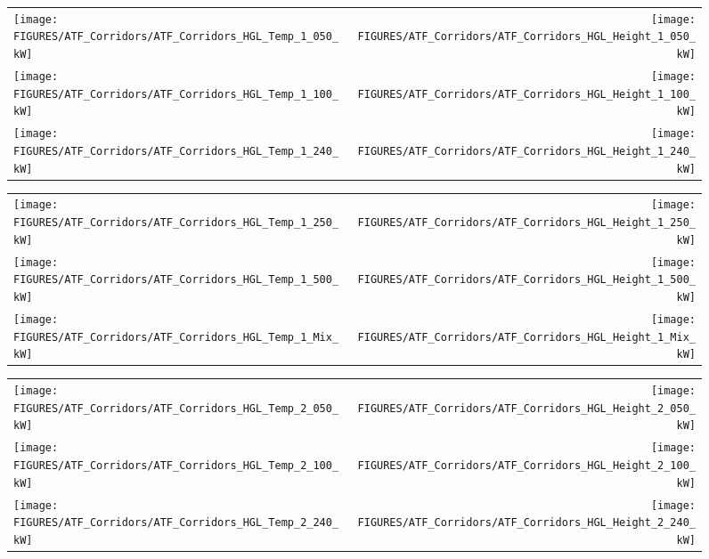 \begin{figure}[h!]
\begin{tabular*}{\textwidth}{l@{\extracolsep{\fill}}r}
\texttt{[image: FIGURES/ATF\_Corridors/ATF\_Corridors\_HGL\_Temp\_1\_050\_kW]} &
\texttt{[image: FIGURES/ATF\_Corridors/ATF\_Corridors\_HGL\_Height\_1\_050\_kW]} \\
\texttt{[image: FIGURES/ATF\_Corridors/ATF\_Corridors\_HGL\_Temp\_1\_100\_kW]} &
\texttt{[image: FIGURES/ATF\_Corridors/ATF\_Corridors\_HGL\_Height\_1\_100\_kW]} \\
\texttt{[image: FIGURES/ATF\_Corridors/ATF\_Corridors\_HGL\_Temp\_1\_240\_kW]} &
\texttt{[image: FIGURES/ATF\_Corridors/ATF\_Corridors\_HGL\_Height\_1\_240\_kW]}
\end{tabular*}
\end{figure}

\newpage

\begin{figure}[p]
\begin{tabular*}{\textwidth}{l@{\extracolsep{\fill}}r}
\texttt{[image: FIGURES/ATF\_Corridors/ATF\_Corridors\_HGL\_Temp\_1\_250\_kW]} &
\texttt{[image: FIGURES/ATF\_Corridors/ATF\_Corridors\_HGL\_Height\_1\_250\_kW]} \\
\texttt{[image: FIGURES/ATF\_Corridors/ATF\_Corridors\_HGL\_Temp\_1\_500\_kW]} &
\texttt{[image: FIGURES/ATF\_Corridors/ATF\_Corridors\_HGL\_Height\_1\_500\_kW]} \\
\texttt{[image: FIGURES/ATF\_Corridors/ATF\_Corridors\_HGL\_Temp\_1\_Mix\_kW]} &
\texttt{[image: FIGURES/ATF\_Corridors/ATF\_Corridors\_HGL\_Height\_1\_Mix\_kW]}
\end{tabular*}
\end{figure}

\begin{figure}[p]
\begin{tabular*}{\textwidth}{l@{\extracolsep{\fill}}r}
\texttt{[image: FIGURES/ATF\_Corridors/ATF\_Corridors\_HGL\_Temp\_2\_050\_kW]} &
\texttt{[image: FIGURES/ATF\_Corridors/ATF\_Corridors\_HGL\_Height\_2\_050\_kW]} \\
\texttt{[image: FIGURES/ATF\_Corridors/ATF\_Corridors\_HGL\_Temp\_2\_100\_kW]} &
\texttt{[image: FIGURES/ATF\_Corridors/ATF\_Corridors\_HGL\_Height\_2\_100\_kW]} \\
\texttt{[image: FIGURES/ATF\_Corridors/ATF\_Corridors\_HGL\_Temp\_2\_240\_kW]} &
\texttt{[image: FIGURES/ATF\_Corridors/ATF\_Corridors\_HGL\_Height\_2\_240\_kW]}
\end{tabular*}
\end{figure}

